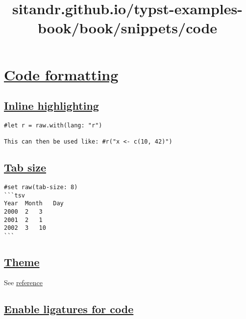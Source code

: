 \title{sitandr.github.io/typst-examples-book/book/snippets/code}

\section{\texorpdfstring{\hyperref[code-formatting]{Code
formatting}}{Code formatting}}\label{code-formatting}

\subsection{\texorpdfstring{\hyperref[inline-highlighting]{Inline
highlighting}}{Inline highlighting}}\label{inline-highlighting}

\begin{verbatim}
#let r = raw.with(lang: "r")

This can then be used like: #r("x <- c(10, 42)")
\end{verbatim}

\pandocbounded{}

\subsection{\texorpdfstring{\hyperref[tab-size]{Tab
size}}{Tab size}}\label{tab-size}

\begin{verbatim}
#set raw(tab-size: 8)
```tsv
Year  Month   Day
2000  2   3
2001  2   1
2002  3   10
```
\end{verbatim}

\pandocbounded{}

\subsection{\texorpdfstring{\hyperref[theme]{Theme}}{Theme}}\label{theme}

See
\href{https://typst.app/docs/reference/text/raw/\#parameters-theme}{reference}

\subsection{\texorpdfstring{\hyperref[enable-ligatures-for-code]{Enable
ligatures for
code}}{Enable ligatures for code}}\label{enable-ligatures-for-code}

